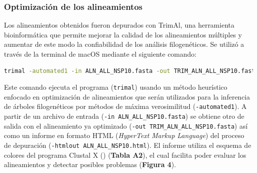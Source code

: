 \subsubsection{Optimización de los alineamientos}

Los alineamientos obtenidos fueron depurados con TrimAl, una herramienta
bioinformática que permite mejorar la calidad de los alineamientos múltiples
y aumentar de este modo la confiabilidad de los análisis filogenéticos. Se 
utilizó a través de la terminal de macOS mediante el siguiente comando:

\begin{lstlisting}[language=bash]
 trimal -automated1 -in ALN_ALL_NSP10.fasta -out TRIM_ALN_ALL_NSP10.fasta -htmlout ALN_ALL_NSP10.html
\end{lstlisting}
    
Este comando ejecuta el programa (\lstinline!trimal!) usando un método 
heurístico enfocado en optimización de alineamientos que serán utilizados 
para la inferencia de árboles filogenéticos por métodos de máxima 
verosimilitud (\lstinline!-automated1!). A partir de un archivo de entrada 
(\lstinline!-in ALN_ALL_NSP10.fasta!) se obtiene otro de salida con el 
alineamiento ya optimizado (\lstinline!-out TRIM_ALN_ALL_NSP10.fasta!) 
así como un informe en formato HTML (\textit{HyperText Markup Language}) del 
proceso de depuración (\lstinline!-htmlout ALN_ALL_NSP10.html!). El informe 
utiliza el esquema de colores del programa Clustal X (\cite{thompson_clustal_x_1997}) 
(\textbf{Tabla A2}), el cual facilita poder evaluar los alineamientos y
detectar posibles problemas (\textbf{Figura 4}).

